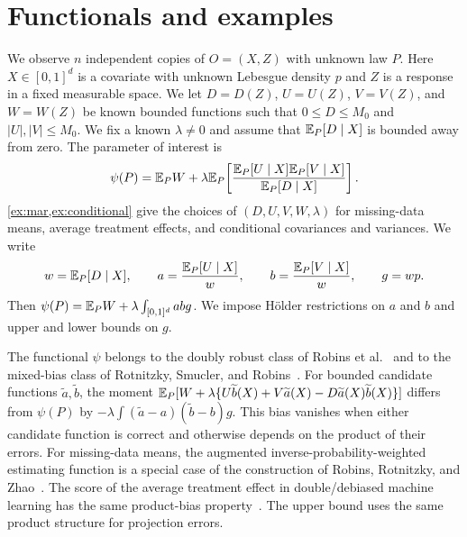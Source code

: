 \section{Functionals and examples}\label{sec:functionals}

We observe $n$ independent copies of $O=(X,Z)$ with unknown law $P$.
Here $X\in[0,1]^d$ is a covariate with unknown Lebesgue density $p$
and $Z$ is a response in a fixed measurable space.
We let $D=D(Z)$, $U=U(Z)$, $V=V(Z)$, and $W=W(Z)$ be known bounded
functions such that $0\le D\le M_0$ and $|U|,|V|\le M_0$.
We fix a known $\lambda\ne0$ and assume that $\mathbb E_P[D\mid X]$ is bounded
away from zero. The parameter of interest is
\begin{equation}\label{eq:generic-functional}
 \psi(P)=\mathbb E_PW+\lambda\mathbb E_P\!\left[
 \frac{\mathbb E_P[U\mid X]\mathbb E_P[V\mid X]}{\mathbb E_P[D\mid X]}\right].
\end{equation}
\cref{ex:mar,ex:conditional} give the choices of
$(D,U,V,W,\lambda)$ for missing-data means, average treatment effects,
and conditional covariances and variances. We write
\begin{equation}\label{eq:generic-moments}
 w=\mathbb E_P[D\mid X],\qquad
 a=\frac{\mathbb E_P[U\mid X]}w,\qquad
 b=\frac{\mathbb E_P[V\mid X]}w,\qquad g=wp.
\end{equation}
Then $\psi(P)=\mathbb E_PW+\lambda\int_{[0,1]^d}abg$. We impose H\"older
restrictions on $a$ and $b$ and upper and lower bounds on $g$.

The functional $\psi$ belongs to the doubly robust class of
Robins et al.~\cite[Section~3.1]{hoif2008} and to the mixed-bias class
of Rotnitzky, Smucler, and Robins~\cite{mixedbias}. For bounded
candidate functions $\widetilde a,\widetilde b$, the moment
$\mathbb E_P[W+\lambda\{U\widetilde b(X)+V\widetilde a(X)-D\widetilde a(X)\widetilde b(X)\}]$
differs from $\psi(P)$ by $-\lambda\int(\widetilde a-a)(\widetilde b-b)g$.
This bias vanishes when either candidate function is correct and otherwise
depends on the product of their errors. For missing-data means, the
augmented inverse-probability-weighted estimating function is a special
case of the construction of Robins, Rotnitzky, and
Zhao~\cite[equation~(9), p.~849, and Section~8]{rrz}.
The score of the average treatment effect in double/debiased machine
learning has the same product-bias property~\cite[Section~9.4,
equations~(9.4.4)--(9.4.5)]{causalmlbook}.
The upper bound uses the same product structure for projection errors.


